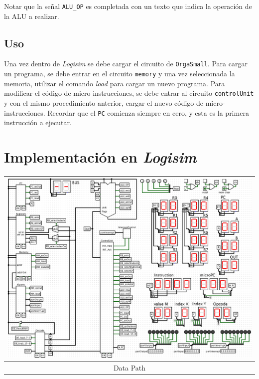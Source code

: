 \documentclass[a4paper,11pt]{article}
\begin{document}
\noindent Notar que la señal \verb|ALU_OP| es completada con un texto que indica la operación de la ALU a realizar.

\subsection*{Uso}

Una vez dentro de \emph{Logisim} se debe cargar el circuito de \texttt{OrgaSmall}.
Para cargar un programa, se debe entrar en el circuito \texttt{memory} y una vez seleccionada la memoria, utilizar el comando \emph{load} para cargar un nuevo programa.
Para modificar el código de micro-instrucciones, se debe entrar al circuito \texttt{controlUnit} y con el mismo procedimiento anterior, cargar el nuevo código de micro-instrucciones.
Recordar que el \texttt{PC} comienza siempre en cero, y esta es la primera instrucción a ejecutar.

\vspace{1cm}

\section*{Implementación en \emph{Logisim}}


\begin{center}
 \begin{tabular}[t]{c}
\includegraphics[scale=0.3]{img/0_dataPath.png} \\
\hline
Data Path \\ \hline
\end{tabular}
\end{center}
\end{document}
